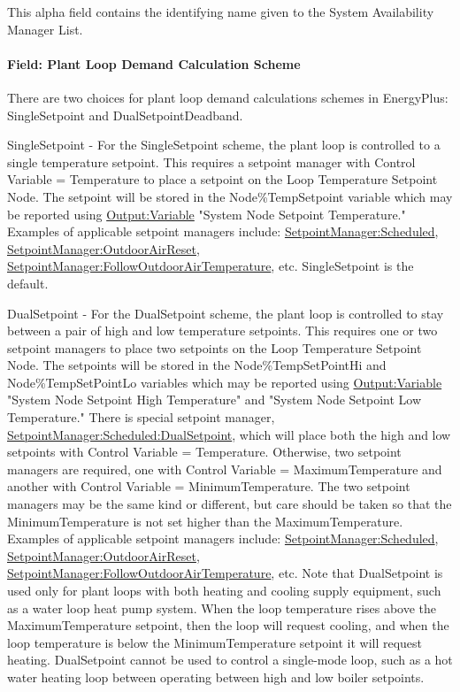 This alpha field contains the identifying name given to the System Availability Manager List.

\paragraph{Field: Plant Loop Demand Calculation Scheme}\label{field-plant-loop-demand-calculation-scheme}
There are two choices for plant loop demand calculations schemes in EnergyPlus: SingleSetpoint and DualSetpointDeadband.

SingleSetpoint - For the SingleSetpoint scheme, the plant loop is controlled to a single temperature setpoint. This requires a setpoint manager with Control Variable = Temperature to place a setpoint on the Loop Temperature Setpoint Node. The setpoint will be stored in the Node\%TempSetpoint variable which may be reported using \hyperref[outputvariable]{Output:Variable} "System Node Setpoint Temperature." Examples of applicable setpoint managers include: \hyperref[setpointmanagerscheduled]{SetpointManager:Scheduled}, \hyperref[setpointmanageroutdoorairreset]{SetpointManager:OutdoorAirReset}, \hyperref[setpointmanagerfollowoutdoorairtemperature]{SetpointManager:FollowOutdoorAirTemperature}, etc. SingleSetpoint is the default.

DualSetpoint - For the DualSetpoint scheme, the plant loop is controlled to stay between a pair of high and low temperature setpoints. This requires one or two setpoint managers to place two setpoints on the Loop Temperature Setpoint Node. The setpoints will be stored in the Node\%TempSetPointHi and Node\%TempSetPointLo variables which may be reported using \hyperref[outputvariable]{Output:Variable} "System Node Setpoint High Temperature" and "System Node Setpoint Low Temperature." There is special setpoint manager, \hyperref[setpointmanagerscheduleddualsetpoint]{SetpointManager:Scheduled:DualSetpoint}, which will place both the high and low setpoints with Control Variable = Temperature. Otherwise, two setpoint managers are required, one with Control Variable = MaximumTemperature and another with Control Variable = MinimumTemperature. The two setpoint managers may be the same kind or different, but care should be taken so that the MinimumTemperature is not set higher than the MaximumTemperature. Examples of applicable setpoint managers include: \hyperref[setpointmanagerscheduled]{SetpointManager:Scheduled}, \hyperref[setpointmanageroutdoorairreset]{SetpointManager:OutdoorAirReset}, \hyperref[setpointmanagerfollowoutdoorairtemperature]{SetpointManager:FollowOutdoorAirTemperature}, etc. Note that DualSetpoint is used only for plant loops with both heating and cooling supply equipment, such as a water loop heat pump system. When the loop temperature rises above the MaximumTemperature setpoint, then the loop will request cooling, and when the loop temperature is below the MinimumTemperature setpoint it will request heating. DualSetpoint cannot be used to control a single-mode loop, such as a hot water heating loop between operating between high and low boiler setpoints.

